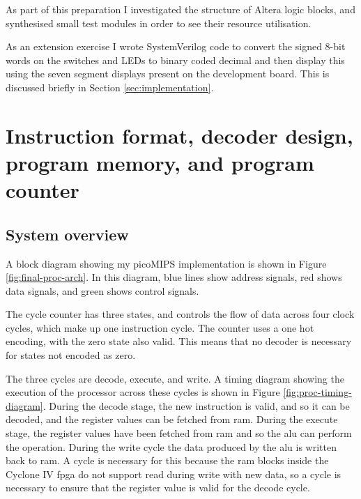 As part of this preparation I investigated the structure of Altera logic blocks, and synthesised small test modules in order to see their resource utilisation.

As an extension exercise I wrote SystemVerilog code to convert the signed 8-bit words on the switches and LEDs to binary coded decimal and then display this using the seven segment displays present on the development board. This is discussed briefly in Section \ref{sec:implementation}.


\section{Instruction format, decoder design, program memory, and program counter} \label{sec:instructions}

\subsection{System overview}

A block diagram showing my picoMIPS implementation is shown in Figure \ref{fig:final-proc-arch}. In this diagram, blue lines show address signals, red shows data signals, and green shows control signals.

The cycle counter has three states, and controls the flow of data across four clock cycles, which make up one instruction cycle. The counter uses a one hot encoding, with the zero state also valid. This means that no decoder is necessary for states not encoded as zero.

The three cycles are decode, execute, and write. A timing diagram showing the execution of the processor across these cycles is shown in Figure \ref{fig:proc-timing-diagram}. During the decode stage, the new instruction is valid, and so it can be decoded, and the register values can be fetched from \gls{ram}. During the execute stage, the register values have been fetched from \gls{ram} and so the \gls{alu} can perform the operation. During the write cycle the data produced by the \gls{alu} is written back to \gls{ram}. A cycle is necessary for this because the \gls{ram} blocks inside the Cyclone IV \gls{fpga} do not support read during write with new data, so a cycle is necessary to ensure that the register value is valid for the decode cycle.

